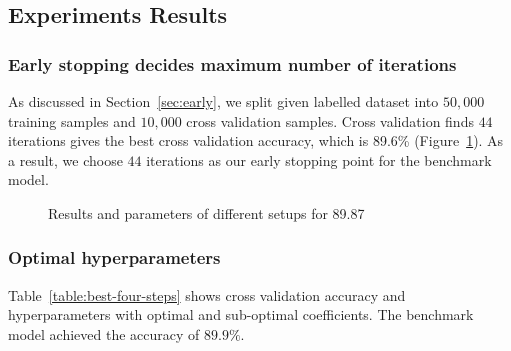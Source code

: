 \subsection{Experiments Results}
\subsubsection{Early stopping decides maximum number of iterations}
As discussed in Section~\ref{sec:early}, we split given labelled dataset into $50,000$ training samples and $10,000$ cross validation samples. Cross validation finds $44$ iterations gives the best cross validation accuracy, which is 89.6\% (Figure~\ref{fig:acc-iter}). As a result, we choose $44$ iterations as our early stopping point for the benchmark model. 


\begin{figure}
    \caption{Results and parameters of different setups for 89.87}
    \label{fig:acc-iter}
\end{figure}

\subsubsection{Optimal hyperparameters}
Table~\ref{table:best-four-steps} shows cross validation accuracy and hyperparameters with optimal and sub-optimal coefficients. The benchmark model achieved the accuracy of $89.9\%$.

